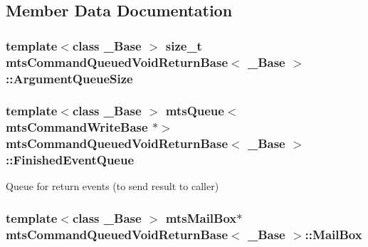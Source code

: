 \subsection{Member Data Documentation}
\hypertarget{classmts_command_queued_void_return_base_a3afbf01037322b73778768074d95c9c7}{
\subsubsection[{Argument\-Queue\-Size}]{\setlength{\rightskip}{0pt plus 5cm}template$<$class \-\_\-\-Base $>$ size\-\_\-t {\bf mts\-Command\-Queued\-Void\-Return\-Base}$<$ \-\_\-\-Base $>$\-::Argument\-Queue\-Size\hspace{0.3cm}{\ttfamily [protected]}}}\label{classmts_command_queued_void_return_base_a3afbf01037322b73778768074d95c9c7}
\hypertarget{classmts_command_queued_void_return_base_a465d5cf2576bc4c931ee7f436846051e}{
\subsubsection[{Finished\-Event\-Queue}]{\setlength{\rightskip}{0pt plus 5cm}template$<$class \-\_\-\-Base $>$ {\bf mts\-Queue}$<${\bf mts\-Command\-Write\-Base} $\ast$$>$ {\bf mts\-Command\-Queued\-Void\-Return\-Base}$<$ \-\_\-\-Base $>$\-::Finished\-Event\-Queue\hspace{0.3cm}{\ttfamily [protected]}}}\label{classmts_command_queued_void_return_base_a465d5cf2576bc4c931ee7f436846051e}
Queue for return events (to send result to caller) \hypertarget{classmts_command_queued_void_return_base_a5e0f1804f0fe7a3aa22cf92eb013cc54}{
\subsubsection[{Mail\-Box}]{\setlength{\rightskip}{0pt plus 5cm}template$<$class \-\_\-\-Base $>$ {\bf mts\-Mail\-Box}$\ast$ {\bf mts\-Command\-Queued\-Void\-Return\-Base}$<$ \-\_\-\-Base $>$\-::Mail\-Box\hspace{0.3cm}{\ttfamily [protected]}}}\label{classmts_command_queued_void_return_base_a5e0f1804f0fe7a3aa22cf92eb013cc54}

